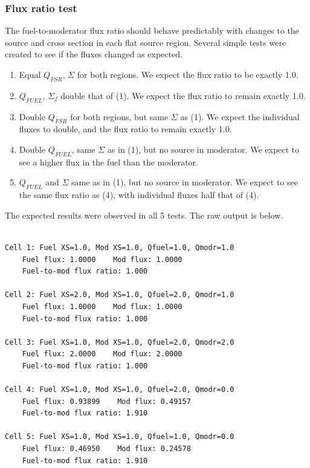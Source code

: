 \documentclass[12pt]{article}
\begin{document}
\newpage
\subsubsection{Flux ratio test}\label{sec:testflux}

The fuel-to-moderator flux ratio should behave predictably with changes to the source and cross section in each flat source region. Several simple tests were created to see if the fluxes changed as expected.

\begin{enumerate}
\item Equal $Q_{FSR}$, $\Sigma$ for both regions. We expect the flux ratio to be exactly 1.0.

\item $Q_{FUEL}$, $\Sigma_f$ double that of (1). We expect the flux ratio to remain exactly 1.0.

\item Double $Q_{FSR}$ for both regions, but same $\Sigma$ as  (1). We expect the individual fluxes to double, and the flux ratio to remain exactly 1.0.

\item Double $Q_{FUEL}$, same $\Sigma$ as in (1), but no source in moderator. We expect to see a higher flux in the fuel than the moderator.

\item $Q_{FUEL}$ and $\Sigma$ same as in (1), but no source in moderator. We expect to see the same flux ratio as (4), with individual fluxes half that of (4).
\end{enumerate}

The expected results were observed in all 5 tests. The raw output is below.

\begin{verbatim}

Cell 1: Fuel XS=1.0, Mod XS=1.0, Qfuel=1.0, Qmodr=1.0
    Fuel flux: 1.0000    Mod flux: 1.0000
    Fuel-to-mod flux ratio: 1.000

Cell 2: Fuel XS=2.0, Mod XS=1.0, Qfuel=2.0, Qmodr=1.0
    Fuel flux: 1.0000    Mod flux: 1.0000
    Fuel-to-mod flux ratio: 1.000

Cell 3: Fuel XS=1.0, Mod XS=1.0, Qfuel=2.0, Qmodr=2.0
    Fuel flux: 2.0000    Mod flux: 2.0000
    Fuel-to-mod flux ratio: 1.000

Cell 4: Fuel XS=1.0, Mod XS=1.0, Qfuel=2.0, Qmodr=0.0
    Fuel flux: 0.93899    Mod flux: 0.49157
    Fuel-to-mod flux ratio: 1.910

Cell 5: Fuel XS=1.0, Mod XS=1.0, Qfuel=1.0, Qmodr=0.0
    Fuel flux: 0.46950    Mod flux: 0.24578
    Fuel-to-mod flux ratio: 1.910
\end{verbatim}
\end{document}
